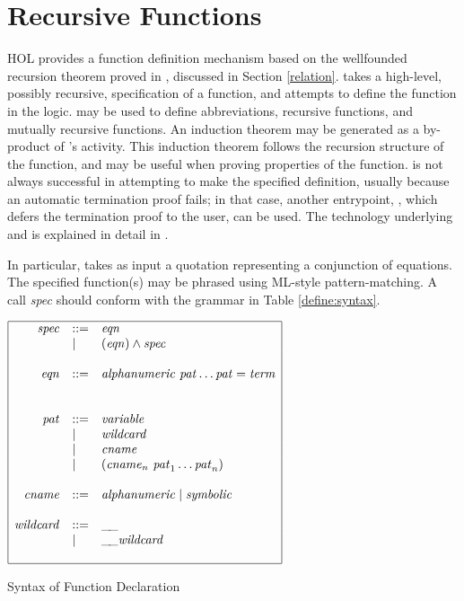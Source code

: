 \section{Recursive Functions}\label{TFL}

HOL{} provides a function definition mechanism based on the
wellfounded recursion theorem proved in ,
discussed in Section \ref{relation}.   takes a high-level,
possibly recursive, specification of a function, and attempts to
define the function in the logic.  may be used to define
abbreviations, recursive functions, and mutually recursive
functions. An induction theorem may be generated as a by-product of
's activity. This induction theorem follows the recursion
structure of the function, and may be useful when proving properties
of the function.  is not always successful in attempting
to make the specified definition, usually because an automatic
termination proof fails; in that case, another entrypoint, ,
which defers the termination proof to the user, can be used.
The technology underlying  and  is explained
in detail in \cite{slind-thesis}.



 In particular,  takes as input a quotation representing a
conjunction of equations. The specified function(s) may be phrased
using ML-style pattern-matching. A call
\textit{spec} should conform with the grammar in Table
\ref{define:syntax}.
\begin{table}[htbp]
\begin{center}
$
\begin{array}{|rll|}
\hline
\mathit{spec} & ::= &  \mathit{eqn} \\
              & \mid  & (\mathit{eqn}) \land \mathit{spec} \\
  & & \\
\mathit{eqn} & ::= & \mathit{alphanumeric}\ \mathit{pat} \ldots \mathit{pat} = \mathit{term} \\
  & & \\
  & & \\
\mathit{pat} & ::= & \mathit{variable} \\
    & \mid   & \mathit{wildcard} \\
    & \mid   & \mathit{cname} \\
    & \mid   & (\mathit{cname}_n\ \mathit{pat}_1 \ldots \mathit{pat}_n) \\
  & & \\
\mathit{cname} & ::= & \mathit{alphanumeric} \mid \mathit{symbolic} \\
  & & \\
\mathit{wildcard} & ::=  & \_\!\_ \\
                  & \mid & \_\!\_ \mathit{wildcard} \\
  & & \\
\hline
\end{array}
$
\caption{Syntax of Function Declaration}\label{define:syntax}
\end{center}
\end{table}

